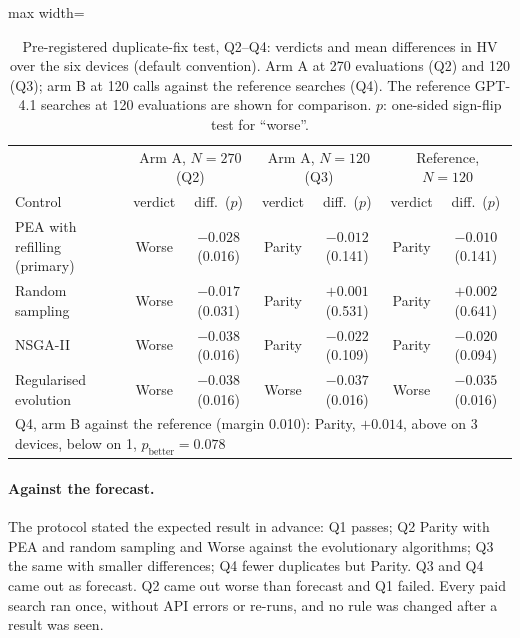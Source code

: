 \documentclass[preprint,12pt,authoryear]{elsarticle}
\begin{document}
\begin{table}[h]\centering\footnotesize
\caption{Pre-registered duplicate-fix test, Q2--Q4: verdicts and mean differences in HV over the six devices (default convention). Arm A at 270 evaluations (Q2) and 120 (Q3); arm B at 120 calls against the reference searches (Q4). The reference GPT-4.1 searches at 120 evaluations are shown for comparison. $p$: one-sided sign-flip test for ``worse''.}\label{tab:dupfixq2}
\setlength{\tabcolsep}{4pt}
\begin{adjustbox}{max width=\linewidth}
\begin{tabular}{l|cc|cc|cc}
\toprule
 & \multicolumn{2}{c|}{Arm A, $N=270$ (Q2)} & \multicolumn{2}{c|}{Arm A, $N=120$ (Q3)} & \multicolumn{2}{c}{Reference, $N=120$} \\
Control & verdict & diff.\ ($p$) & verdict & diff.\ ($p$) & verdict & diff.\ ($p$) \\
\midrule
PEA with refilling (primary) & Worse & $-0.028$ (0.016) & Parity & $-0.012$ (0.141) & Parity & $-0.010$ (0.141) \\
Random sampling              & Worse & $-0.017$ (0.031) & Parity & $+0.001$ (0.531) & Parity & $+0.002$ (0.641) \\
NSGA-II                      & Worse & $-0.038$ (0.016) & Parity & $-0.022$ (0.109) & Parity & $-0.020$ (0.094) \\
Regularised evolution        & Worse & $-0.038$ (0.016) & Worse  & $-0.037$ (0.016) & Worse  & $-0.035$ (0.016) \\
\midrule
\multicolumn{7}{l}{Q4, arm B against the reference (margin 0.010): Parity, $+0.014$, above on 3 devices, below on 1, $p_{\text{better}}=0.078$} \\
\bottomrule
\end{tabular}
\end{adjustbox}
\end{table}

\paragraph{Against the forecast.} The protocol stated the expected result in advance: Q1 passes; Q2 Parity with PEA and random sampling and Worse against the evolutionary algorithms; Q3 the same with smaller differences; Q4 fewer duplicates but Parity. Q3 and Q4 came out as forecast. Q2 came out worse than forecast and Q1 failed. Every paid search ran once, without API errors or re-runs, and no rule was changed after a result was seen.
\end{document}
